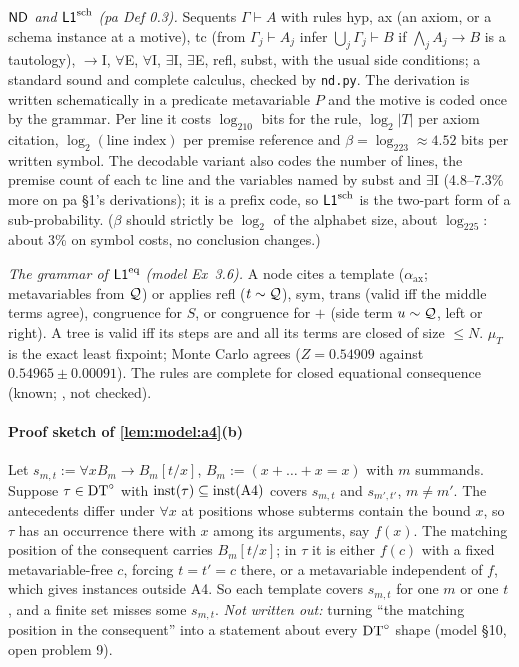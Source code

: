 \emph{$\mathsf{ND}$ and $\mathord{\mathsf{L1}}^{\mathrm{sch}}$ (pa Def 0.3).} Sequents $\Gamma\vdash A$ with rules hyp, ax (an axiom, or a schema instance at a motive), tc (from $\Gamma_j\vdash A_j$ infer $\bigcup_j\Gamma_j\vdash B$ if $\bigwedge_jA_j\to B$ is a tautology), $\to$I, $\forall$E, $\forall$I, $\exists$I, $\exists$E, refl, subst, with the usual side conditions; a standard sound and complete calculus, checked by \texttt{nd.py}. The derivation is written schematically in a predicate metavariable $P$ and the motive is coded once by the grammar. Per line it costs $\log_210$ bits for the rule, $\log_2|T|$ per axiom citation, $\log_2(\text{line index})$ per premise reference and $\beta=\log_223\approx4.52$ bits per written symbol. The decodable variant also codes the number of lines, the premise count of each tc line and the variables named by subst and $\exists$I (4.8--7.3\% more on pa \S1's derivations); it is a prefix code, so $\mathord{\mathsf{L1}}^{\mathrm{sch}}$ is the two-part form of a sub-probability. ($\beta$ should strictly be $\log_2$ of the alphabet size, about $\log_225$: about 3\% on symbol costs, no conclusion changes.)

\emph{The grammar of $\mathord{\mathsf{L1}}^{\mathrm{eq}}$ (model Ex~3.6).} A node cites a template ($\alpha_{\mathrm{ax}}$; metavariables from $\mathcal{Q}$) or applies refl ($t\sim\mathcal{Q}$), sym, trans (valid iff the middle terms agree), congruence for $S$, or congruence for $+$ (side term $u\sim\mathcal{Q}$, left or right). A tree is valid iff its steps are and all its terms are closed of size $\le N$. $\mu_T$ is the exact least fixpoint; Monte Carlo agrees ($Z=0.54909$ against $0.54965\pm0.00091$). The rules are complete for closed equational consequence (known; \citealp{birkhoff1935structure}, not checked).

\paragraph{Proof sketch of \cref{lem:model:a4}(b)}\label{app:model:a4}
Let $s_{m,t}:=\forall xB_m\to B_m[t/x]$, $B_m:=(x+\dots+x=x)$ with $m$ summands. Suppose $\tau\in\mathrm{DT}^{\circ}$ with $\mathrm{inst}(\tau)\subseteq\mathrm{inst}(\mathrm{A4})$ covers $s_{m,t}$ and $s_{m',t'}$, $m\ne m'$. The antecedents differ under $\forall x$ at positions whose subterms contain the bound $x$, so $\tau$ has an occurrence there with $x$ among its arguments, say $f(x)$. The matching position of the consequent carries $B_m[t/x]$; in $\tau$ it is either $f(c)$ with a fixed metavariable-free $c$, forcing $t=t'=c$ there, or a metavariable independent of $f$, which gives instances outside A4. So each template covers $s_{m,t}$ for one $m$ or one $t$, and a finite set misses some $s_{m,t}$. \emph{Not written out:} turning ``the matching position in the consequent'' into a statement about every $\mathrm{DT}^{\circ}$ shape (model \S10, open problem 9).

